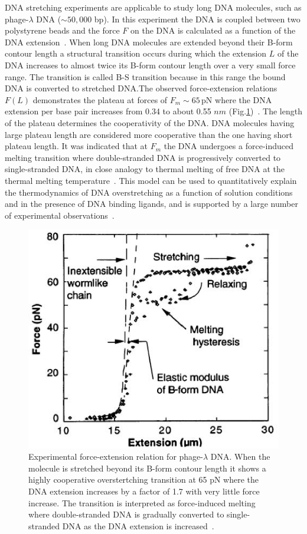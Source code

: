 \documentclass[12pt,masters,final]{UTRGVthesis}
\begin{document}
\indent
DNA stretching experiments are applicable to study long DNA molecules, such as phage-$\lambda$ DNA ($\sim 50,000$ bp). In this experiment the DNA is coupled between two polystyrene beads and the force $F$ on the DNA is calculated as a function of the DNA extension~\cite{Smith:1996, CS:2000, Strick:2003, C:2010}. When long DNA molecules are extended beyond their B-form contour length a structural transition occurs during which the extension $L$ of the DNA increases to almost twice its B-form contour length over a very small force range. The transition is called B-S transition because in this range the bound DNA is converted to stretched DNA.The observed force-extension relations $F(L)$ demonstrates the plateau at forces of $F_m \sim 65$\,pN where the DNA extension per base pair increases from 0.34 to about 0.55 $nm$ (Fig.\ref{fig:DNA overstretching})~\cite{Smith:1996, CS:2000, Strick:2003, C:2010}. The length of the plateau determines the cooperativity of the DNA. DNA molecules having large plateau length are considered more cooperative than the one having short plateau length. It was indicated that at $F_m$ the DNA undergoes a force-induced melting transition where double-stranded DNA is progressively converted to single-stranded DNA, in close analogy to thermal melting of free DNA at the thermal melting temperature~\cite{C:2010}. This model can be used to quantitatively explain the thermodynamics of DNA overstretching as a function of solution conditions and in the presence of DNA binding ligands, and is supported by a 
large number of experimental observations~\cite{C:2010}. 
%
\begin{figure}[!h]
  \includegraphics[width=0.5 \textwidth]{dna_overstretching.eps}
  \caption{\small Experimental force-extension relation for phage-$\lambda$ DNA. When the molecule is stretched beyond its B-form contour length it shows a highly cooperative overstertching transition at 65 pN where the DNA extension increases by a factor of 1.7 with very little force increase. The transition is interpreted as force-induced melting where double-stranded DNA is gradually converted to single-stranded DNA as the DNA extension is increased~\protect\cite{Smith:1996}.}
  \label{fig:DNA overstretching}
\end{figure}
%
\newpage
\end{document}
